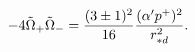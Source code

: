 \begin{equation}
-4\tilde{\Omega}_{+}\tilde{\Omega}_{-}=
{(3\pm 1)^{2}\over 16}{(\alpha' p^{+})^{2}\over r^{2}_{*d}}.
\label{eq:fermimass}
\end{equation}

